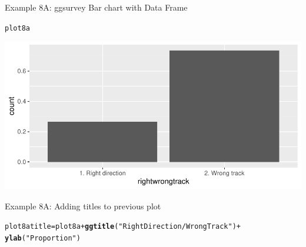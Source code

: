 \documentclass{beamer}\usepackage[]{graphicx}\usepackage[]{xcolor}
\makeatletter
\newcommand{\hlstr}[1]{\textcolor[rgb]{0.192,0.494,0.8}{#1}}%
\newcommand{\hlopt}[1]{\textcolor[rgb]{0,0,0}{#1}}%
\newcommand{\hlstd}[1]{\textcolor[rgb]{0.345,0.345,0.345}{#1}}%
\newcommand{\hlkwb}[1]{\textcolor[rgb]{0.69,0.353,0.396}{#1}}%
\newcommand{\hlkwd}[1]{\textcolor[rgb]{0.737,0.353,0.396}{\textbf{#1}}}%
\newenvironment{kframe}{%
 \def\at@end@of@kframe{}%
 \ifinner\ifhmode%
  \def\at@end@of@kframe{\end{minipage}}%
  \begin{minipage}{\columnwidth}%
 \fi\fi%
 \def\FrameCommand##1{\hskip\@totalleftmargin \hskip-\fboxsep
 \colorbox{shadecolor}{##1}\hskip-\fboxsep
     \hskip-\linewidth \hskip-\@totalleftmargin \hskip\columnwidth}%
 \MakeFramed {\advance\hsize-\width
   \@totalleftmargin\z@ \linewidth\hsize
   \@setminipage}}%
 {\par\unskip\endMakeFramed%
 \at@end@of@kframe}
\newenvironment{knitrout}{}{} %
\makeatother
\begin{document}
\begin{frame}[fragile]{Example 8A: ggsurvey Bar chart with Data Frame}
\begin{knitrout}
\color{fgcolor}\begin{kframe}
\begin{alltt}
\hlstd{plot8a}
\end{alltt}
\end{kframe}
\includegraphics[width=0.95\linewidth]{figure/unnamed-chunk-44-1} 
\end{knitrout}

\end{frame}
\begin{frame}[fragile]{Example 8A: Adding titles to previous plot}
\begin{knitrout}
\color{fgcolor}\begin{kframe}
\begin{alltt}
\hlstd{plot8atitle} \hlkwb{=} \hlstd{plot8a} \hlopt{+} \hlkwd{ggtitle}\hlstd{(}\hlstr{"Right Direction / Wrong Track"}\hlstd{)} \hlopt{+}
    \hlkwd{ylab}\hlstd{(}\hlstr{"Proportion"}\hlstd{)}
\end{alltt}
\end{kframe}
\end{knitrout}
\end{frame}
\end{document}
